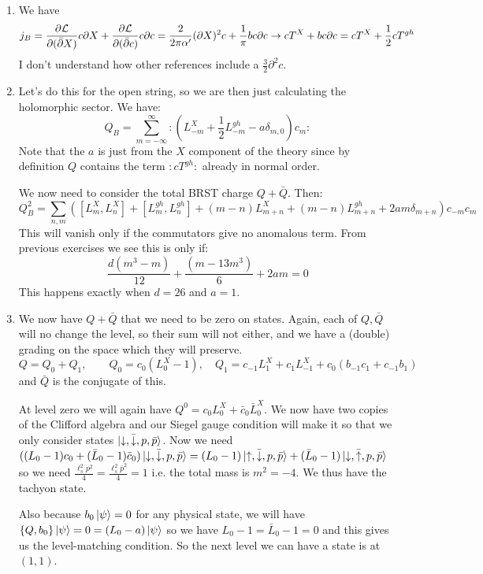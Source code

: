 \documentclass[11pt, class=article, crop=false]{standalone}
\begin{document}
\begin{enumerate}
	  \item We have
	  \[
	  	j_B = \frac{\partial \mathcal L}{\partial (\bar {\partial} X)} c \partial X + \frac{\partial \mathcal L}{\partial (\bar {\partial} c)} c \partial c 
		= \frac{2}{2 \pi \alpha'} (\partial X)^2 c + \frac1\pi b c \partial c 
		\to c T^X + b c \partial c = c T^X + \frac12 c T^{gh}
	  \]
	  I don't understand how other references include a $\frac32 \partial^2 c$.
	  
	  \item Let's do this for the open string, so we are then just calculating the holomorphic sector. We have:
	  \[
	  	Q_B = \sum_{m=-\infty}^\infty :(L_{-m}^X + \frac12 L_{-m}^{gh} - a \delta_{m, 0}) c_{m}:
	  \]
	  Note that the $a$ is just from the $X$ component of the theory since by definition $Q$ contains the term $:c T^{gh}:$ already in normal order.
	  	  
	  We now need to consider the total BRST charge $Q + \bar Q$. Then:
	  \[
	  	Q_{B}^2 = \sum_{n,m} ([L_m^X, L_n^X] + [L_m^{gh}, L_n^{gh}] + (m-n) L_{m+n}^X + (m-n) L_{m+n}^{gh} + 2 a m \delta_{m+n})c_{-m} c_m
	  \]
	  This will vanish only if the commutators give no anomalous term. From previous exercises we see this is only if: 
	  \[
	  	\frac{d(m^3 - m)}{12} + \frac{(m - 13 m^3)}{6} + 2 a m = 0
	  \]
	  This happens exactly when $d = 26$ and $a = 1$.
	  
	  \item We now have $Q + \bar Q$ that we need to be zero on states. Again, each of $Q, \bar Q$ will no change the level, so their sum will not either, and we have a (double) grading on the space which they will preserve. 
	  \[
	  	Q= Q_0 + Q_1, \qquad Q_0 = c_0 (L_0^X - 1), \quad Q_1 = c_{-1} L_1^X + c_1 L_{-1}^X + c_0 (b_{-1} c_1 + c_{-1} b_1)
	  \]
	  and $\bar Q$ is the conjugate of this.
	  
	  At level zero we will again have $Q^0 = c_0 L_0^X + \bar c_0 \bar L^X_0 $. We now have two copies of the Clifford algebra and our Siegel gauge condition will make it so that we only consider states $\ket{\downarrow, \bar \downarrow, p, \bar p}$. Now we need $((L_0 - 1) c_0 + (\bar L_0 - 1) \bar c_0) \ket{\downarrow, \bar \downarrow, p, \bar p} = (L_0 - 1) \ket{\uparrow, \bar \downarrow, p, \bar p} + (\bar L_0 - 1) \ket{\downarrow, \bar \uparrow, p, \bar p}$ so we need $\frac{\ell_s^2 p^2}4 = \frac{\ell_s^2 \bar p^2}4 = 1$ i.e. the total  mass is $m^2 = -4$. We thus have the tachyon state.
	  
	  Also because $b_0 \ket{\psi} = 0$ for any physical state, we will have $\{ Q, b_0 \} \ket{\psi} = 0 = (L_0 - a) \ket{\psi}$ so we have $L_0 - 1 = \bar L_0 - 1 = 0$ and this gives us the level-matching condition. So the next level we can have a state is at $(1,1)$.
	  

\end{enumerate}
\end{document}
